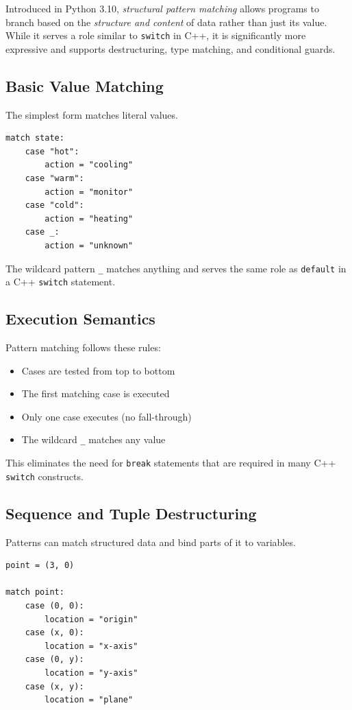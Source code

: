 Introduced in Python 3.10, \emph{structural pattern matching} allows programs to branch based on the \emph{structure and content} of data rather than just its value. While it serves a role similar to \texttt{switch} in C++, it is significantly more expressive and supports destructuring, type matching, and conditional guards.

\subsection{Basic Value Matching}

The simplest form matches literal values.

\begin{verbatim}
match state:
    case "hot":
        action = "cooling"
    case "warm":
        action = "monitor"
    case "cold":
        action = "heating"
    case _:
        action = "unknown"
\end{verbatim}

The wildcard pattern \texttt{\_} matches anything and serves the same role as \texttt{default} in a C++ \texttt{switch} statement.

\subsection{Execution Semantics}

Pattern matching follows these rules:
\begin{itemize}
  \item Cases are tested from top to bottom
  \item The first matching case is executed
  \item Only one case executes (no fall-through)
  \item The wildcard \texttt{\_} matches any value
\end{itemize}

This eliminates the need for \texttt{break} statements that are required in many C++ \texttt{switch} constructs.

\subsection{Sequence and Tuple Destructuring}

Patterns can match structured data and bind parts of it to variables.

\begin{verbatim}
point = (3, 0)

match point:
    case (0, 0):
        location = "origin"
    case (x, 0):
        location = "x-axis"
    case (0, y):
        location = "y-axis"
    case (x, y):
        location = "plane"
\end{verbatim}

